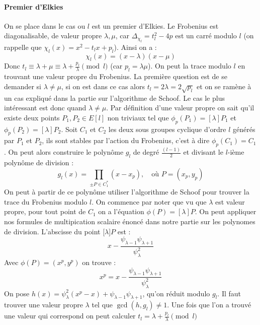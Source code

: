 \documentclass{article}
\begin{document}
\paragraph*{Premier d'Elkies}
On se place dans le cas ou $l$ est un premier d'Elkies. Le Frobenius est diagonalisable, de valeur propre $\lambda, \mu$, car $\Delta_{\chi_l} =t_l^2 -4p$ est un carré modulo $l$ (on rappelle que $\chi_{l}(x) = x^2 - t_lx +p_l$). Ainsi on a :
\begin{equation*}
\chi_l(x) = (x - \lambda)(x- \mu)
\end{equation*}
Donc $t_l \equiv \lambda +\mu \equiv \lambda + \frac{p_l}{\lambda} \pmod l$ (car $p_l = \lambda\mu$). On peut la trace modulo $l$ en trouvant une valeur propre du Frobenius. La première question est de se demander si $\lambda \ne \mu$, si on est dans ce cas alors $t_l = 2 \lambda = 2 \sqrt{p_l}$ et on se ramène à un cas expliqué dans la partie sur l'algorithme de Schoof. Le cas le plus intéressant est donc quand $\lambda \ne \mu$. Par définition d'une valeur propre on sait qu'il existe deux points $P_1,P_2 \in E[l]$ non triviaux tel que $\phi_p(P_1) = [\lambda]P_1$ et $\phi_p(P_2) = [\lambda]P_2$. Soit $C_1$ et $C_2$ les deux sous groupes cyclique d'ordre $l$ générés par $P_1$ et $P_2$, ils sont stables par l'action du Frobenius, c'est à dire $\phi_p(C_1) = C_1$. On peut alors construire le polynôme $g_l$ de degré $\frac{(l-1)}{2}$ et divisant le $l$-ième polynôme de division : 
\begin{equation}
\label{poly g_l}
g_l(x) = \prod_{\pm P \in C_1^*} (x - x_p), \quad \text{où } P = (x_p, y_p)
\end{equation}
On peut à partir de ce polynôme utiliser l'algorithme de Schoof pour trouver la trace du Frobenius modulo $l$. On commence par noter que vu que $\lambda$ est valeur propre, pour tout point de $C_1$  on a l'équation $\phi(P) = [\lambda]P$. On peut appliquer nos formules de multipication scalaire énoncé dans notre partie sur les polynomes de division. L'abscisse du point [$\lambda$]$P$ est : 
\begin{equation*}
x - \frac{\psi_{\lambda-1}\psi_{\lambda+1}}{\psi_{\lambda}^2}
\end{equation*}
Avec $\phi(P)=(x^p,y^p)$ on trouve :
\begin{equation*}
x^p = x - \frac{\psi_{\lambda-1}\psi_{\lambda+1}}{\psi_{\lambda}^2}
\end{equation*}
On pose $h(x) = \psi_{\lambda}^2(x^p-x) + \psi_{\lambda-1}\psi_{\lambda+1}$, qu'on réduit modulo $g_l$. Il faut trouver une valeur propre $\lambda$ tel que $\gcd(h,g_l) \ne 1$. Une fois que l'on a trouvé une valeur qui correspond on peut calculer $t_l = \lambda + \frac{p_l}{\lambda} \pmod l$
\end{document}
